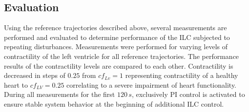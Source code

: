 \subsection{Evaluation}
Using the reference trajectories described above, several measurements are performed and evaluated to determine performance of the ILC subjected to repeating disturbances. Measurements were performed for varying levels of contractility of the left ventricle for all reference trajectories. The performance results of the contractility levels are compared to each other. Contractility is decreased in steps of $0.25$ from $cf_{Lv}=1$ representing contractility of a healthy heart to $cf_{LV}=0.25$ correlating to a severe impairment of heart functionality.
\\During all measurements for the first $120\,s$, exclusively PI control is activated to ensure stable system behavior at the beginning of additional ILC control.

